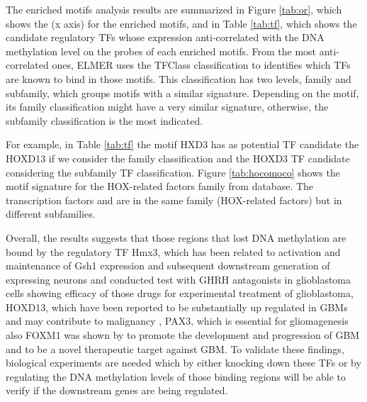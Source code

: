 The enriched motifs analysis results are summarized in Figure \ref{tab:or},
which shows the  (x axis) for the enriched motifs, and in Table  \ref{tab:tf},
which shows the candidate regulatory TFs whose expression anti-correlated
with the DNA methylation level on the probes of each enriched motifs.
 From the most anti-correlated ones, ELMER uses the TFClass
 classification \cite{doi:10.1093/nar/gku1064} to identifies
 which TFs are  known to bind in those motifs.
 This classification has two levels, family and subfamily,
  which groups motifs with a similar signature.
  Depending on the motif, its family classification might have a
  very similar signature, otherwise, the subfamily classification is the most indicated.




For example, in Table \ref{tab:tf} the motif HXD3 has as potential TF candidate the HOXD13 if we consider the family  classification and the HOXD3 TF candidate considering the subfamily TF classification. Figure \ref{tab:hocomoco} shows the motif signature for the HOX-related factors family from  database. The transcription factors  and  are in the same family (HOX-related factors) but in different subfamilies.




Overall, the results suggests that those regions that lost DNA methylation are bound by the regulatory TF Hmx3,
which  has been related to activation and maintenance of Gsh1 expression and subsequent downstream generation of  expressing neurons \cite{morales2014regionalized} and  conducted test with GHRH antagonists in glioblastoma cells showing efficacy of those drugs for experimental treatment of glioblastoma, HOXD13, which have been reported to be substantially up regulated in GBMs and may contribute to malignancy \cite{lee2015identification}, PAX3, which is essential for gliomagenesis \cite{xia2013pax3} also FOXM1  was shown by  to  promote the development and progression of GBM  and to be a novel therapeutic target against GBM.
To validate these findings, biological experiments are needed which by either knocking down these TFs or by regulating the DNA methylation levels of those binding regions will be able to verify if the downstream genes are being regulated.

